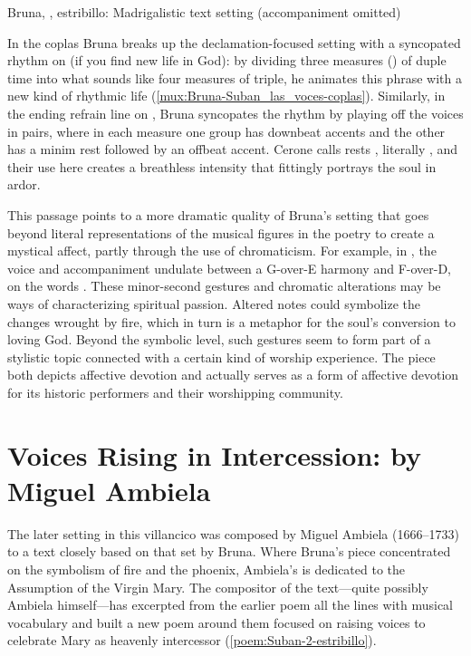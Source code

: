
{Bruna, , estribillo: Madrigalistic text setting
(accompaniment omitted)}

In the coplas Bruna breaks up the declamation-focused setting with a syncopated
rhythm on  (if you find new life in God):
by dividing three measures () of duple time into what sounds like
four measures of triple, he animates this phrase with a new kind of rhythmic
life (\cref{mux:Bruna-Suban_las_voces-coplas}).
Similarly, in the ending refrain line on , Bruna syncopates the
rhythm by playing off the voices in pairs, where in each measure one group has
downbeat accents and the other has a minim rest followed by an offbeat accent.
Cerone calls rests , literally , and their use
here creates a breathless intensity that fittingly portrays the soul in ardor.%
    \citXXX[Cerone]

This passage points to a more dramatic quality of Bruna's setting that goes
beyond literal representations of the musical figures in the poetry to create a
mystical affect, partly through the use of chromaticism.
For example, in , the voice and accompaniment undulate between a
G-over-E\fl{} harmony and F\sh-over-D, on the words .
These minor-second gestures and chromatic alterations may be
ways of characterizing spiritual passion.
Altered notes could symbolize the changes wrought by fire, which in turn is a
metaphor for the soul's conversion to loving God.  
Beyond the symbolic level, such gestures seem to form part of a stylistic topic
connected with a certain kind of worship experience.  
The piece both depicts affective devotion and actually serves as a form of
affective devotion for its historic performers and their worshipping community.



\section{%
Voices Rising in Intercession: 
 by Miguel Ambiela
}

The later setting in this villancico was composed by Miguel Ambiela (1666--1733)
to a text closely based on that set by Bruna.
Where Bruna's piece concentrated on the symbolism of fire and the phoenix,
Ambiela's is dedicated to the Assumption of the Virgin Mary.
The compositor of the text---quite possibly Ambiela himself---has excerpted from
the earlier poem all the lines with musical vocabulary and built a new poem
around them focused on raising voices to celebrate Mary as heavenly intercessor
(\cref{poem:Suban-2-estribillo}).

